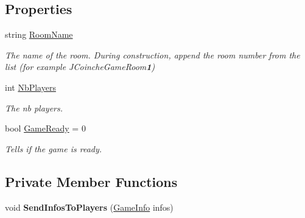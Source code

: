 \subsection*{Properties}
\begin{DoxyCompactItemize}
\item 
string \hyperlink{class_coinche_1_1_server_1_1_game_room_adbb1a1fad88f28e74a797c17740498a3}{Room\+Name}
\begin{DoxyCompactList}\small\item\em The name of the room. During construction, append the room number from the list (for example J\+Coinche\+Game\+Room{\bfseries 1}) \end{DoxyCompactList}\item 
int \hyperlink{class_coinche_1_1_server_1_1_game_room_af935d9c088df65c2a8f086a82bb57a2f}{Nb\+Players}
\begin{DoxyCompactList}\small\item\em The nb players. \end{DoxyCompactList}\item 
bool \hyperlink{class_coinche_1_1_server_1_1_game_room_a2f2917f7cb59584d7a1b2fac6d6779ae}{Game\+Ready} = 0
\begin{DoxyCompactList}\small\item\em Tells if the game is ready. \end{DoxyCompactList}\end{DoxyCompactItemize}
\subsection*{Private Member Functions}
\begin{DoxyCompactItemize}
\item 
\mbox{\label{class_coinche_1_1_server_1_1_game_room_a096e8a7a7da51b13c0e58665caceb67f}} 
void {\bfseries Send\+Infos\+To\+Players} (\hyperlink{class_coinche_1_1_tools_1_1_game_info}{Game\+Info} infos)
\end{DoxyCompactItemize}
